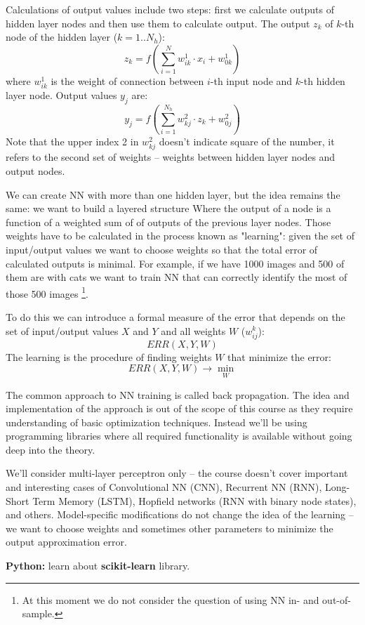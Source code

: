 Calculations of output values include two steps:
first we calculate outputs of hidden layer nodes and then use
them to calculate output. The output $z_k$ of $k$-th node of the
hidden layer ($k=1..N_h$):
$$
z_k = f( \sum_{i=1}^N w_{ik}^1\cdot x_i + w_{0k}^1 )
$$
where $w_{ik}^1$ is the weight of connection between $i$-th
input node and $k$-th hidden layer node. Output values $y_j$ are:
$$
y_j = f( \sum_{i=1}^{N_h} w_{kj}^2\cdot z_k + w_{0j}^2 )
$$
Note that the upper index 2 in $w_{kj}^2$ doesn't indicate
square of the number, it refers to the second set of weights --
weights between hidden layer nodes and output nodes.

We can create NN with more than one hidden layer, but the 
idea remains the same: we want to build a layered structure
Where the output of a node is a function of a weighted sum of
of outputs of the previous layer nodes. Those weights have to be
calculated in the process known as "learning": given the set of
input/output values we want to choose weights so that the total
error of calculated outputs is minimal. For example, if we have
1000 images and 500 of them are with cats we want to train NN
that can correctly identify the most of those 500 images
\footnote{At this moment we do not consider the question of
using NN in- and out-of-sample.}.

To do this we can introduce a formal measure of the error that
depends on the set of input/output values $X$ and $Y$ and
all weights $W$ ($w^{k}_{ij}$):
$$
ERR(X,Y,W)
$$
The learning is the procedure of finding weights $W$ that minimize
the error:
$$
ERR(X,Y,W) \rightarrow\min_{W}
$$

The common approach to NN training is called back propagation.
The idea and implementation of the approach is out of the scope of
this course as they require understanding of basic optimization
techniques. Instead we'll be using programming libraries where
all required functionality is available without going deep into
the theory.

We'll consider multi-layer perceptron only -- the course
doesn't cover important and interesting cases of Convolutional NN (CNN),
Recurrent NN (RNN), Long-Short Term Memory (LSTM),
Hopfield networks (RNN with binary node states), and others.
Model-specific modifications do not change the idea of the learning
 -- we want to choose weights and sometimes
other parameters to minimize the output approximation error.

\begin{tcolorbox}
\textbf{Python:} learn about \textbf{scikit-learn} library.
\end{tcolorbox}




